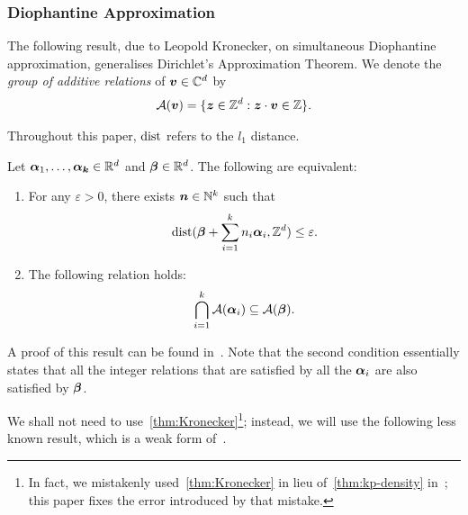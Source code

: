 \subsubsection{Diophantine Approximation}

The following result, due to Leopold Kronecker, on simultaneous Diophantine approximation, generalises Dirichlet's Approximation Theorem. We denote the \emph{group of additive relations} of $\boldsymbol{v} \in \mathbb{C}^{d}$ by
\begin{align*}
{\mathcal{A}}(\boldsymbol{v}) = \lbrace \boldsymbol{z} \in \mathbb{Z}^{d} : \boldsymbol{z} \cdot \boldsymbol{v} \in \mathbb{Z} \rbrace .
\end{align*}

Throughout this paper, $\operatorname{dist}$ refers to the $l_{1}$ distance.

\begin{theorem}[Kronecker]
\label{thm:Kronecker}
Let $\boldsymbol{\alpha}_{1}, \ldots, \boldsymbol{\alpha_{k}} \in \mathbb{R}^{d}$ and $\boldsymbol{\beta} \in \mathbb{R}^{d}$. The following are equivalent:
\begin{enumerate}
\item For any $\varepsilon > 0$, there exists $\boldsymbol{n} \in \mathbb{N}^{k}$ such that
\begin{align*}
\operatorname{dist}(\boldsymbol{\beta} + \sum\limits_{i=1}^{k} n_{i} \boldsymbol{\alpha}_{i}, \mathbb{Z}^{d}) \leq \varepsilon .
\end{align*}
\item The following relation holds:
\begin{align*}
\bigcap\limits_{i=1}^{k} {\mathcal{A}}(\boldsymbol{\alpha}_{i}) \subseteq {\mathcal{A}}(\boldsymbol{\beta}) .
\end{align*}
\end{enumerate}
\end{theorem}

A proof of this result can be found in~\cite{Cassels}.
Note that the second condition essentially states that all the integer relations that are satisfied by all the $\boldsymbol{\alpha}_{i}$ are also satisfied by $\boldsymbol{\beta}$.

We shall not need to use~\cref{thm:Kronecker}\footnote{In fact, we mistakenly used~\cref{thm:Kronecker} in lieu of~\cref{thm:kp-density} in~\cite{LICS16}; this paper fixes the error introduced by that mistake.}; instead, we will use the following less known result, which is a weak form of~\cite[Corollary 2.8]{KhachiyanP97}.

